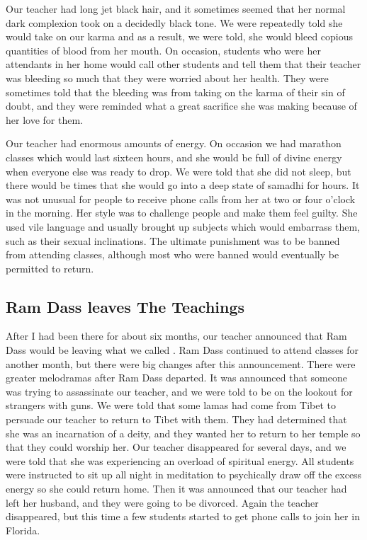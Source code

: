 \documentclass[a5paper,10pt,english]{book}
\begin{document}
\sphinxAtStartPar
Our teacher had long jet black hair, and it sometimes seemed that her
normal dark complexion took on a decidedly black tone. We were
repeatedly told she would take on our karma and as a result, we were
told, she would bleed copious quantities of blood from her mouth. On
occasion, students who were her attendants in her home would call other
students and tell them that their teacher was bleeding so much that they
were worried about her health. They were sometimes told that the
bleeding was from taking on the karma of their sin of doubt, and they
were reminded what a great sacrifice she was making because of her love
for them.

\sphinxAtStartPar
Our teacher had enormous amounts of energy. On occasion we had marathon
classes which would last sixteen hours, and she would be full of divine
energy when everyone else was ready to drop. We were told that she did
not sleep, but there would be times that she would go into a deep state
of samadhi for hours. It was not unusual for people to receive phone
calls from her at two or four o’clock in the morning. Her style was to
challenge people and make them feel guilty. She used vile language and
usually brought up subjects which would embarrass them, such as their
sexual inclinations. The ultimate punishment was to be banned from
attending classes, although most who were banned would eventually be
permitted to return.


\subsection{Ram Dass leaves The Teachings}
\label{\detokenize{psychopaths:ram-dass-leaves-the-teachings}}
\sphinxAtStartPar
After I had been there for about six months, our teacher announced that
Ram Dass would be leaving what we called . Ram Dass
continued to attend classes for another month, but there were big
changes after this announcement. There were greater melodramas after Ram
Dass departed. It was announced that someone was trying to assassinate
our teacher, and we were told to be on the lookout for strangers with
guns. We were told that some lamas had come from Tibet to persuade our
teacher to return to Tibet with them. They had determined that she was
an incarnation of a deity, and they wanted her to return to her temple
so that they could worship her. Our teacher disappeared for several
days, and we were told that she was experiencing an overload of
spiritual energy. All students were instructed to sit up all night in
meditation to psychically draw off the excess energy so she could return
home. Then it was announced that our teacher had left her husband, and
they were going to be divorced. Again the teacher disappeared, but this
time a few students started to get phone calls to join her in Florida.
\end{document}
